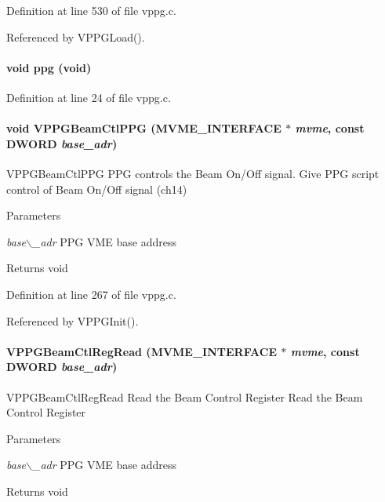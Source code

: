 Definition at line 530 of file vppg.c.

Referenced by VPPGLoad().
\paragraph[{ppg}]{\setlength{\rightskip}{0pt plus 5cm}void ppg (void)}\hfill\label{vppg_8c_a763ec2fd56afac7a05f9d3ca2d29328e}


Definition at line 24 of file vppg.c.
\paragraph[{VPPGBeamCtlPPG}]{\setlength{\rightskip}{0pt plus 5cm}void VPPGBeamCtlPPG ({\bf MVME\_\-INTERFACE} $\ast$ {\em mvme}, \/  const {\bf DWORD} {\em base\_\-adr})}\hfill\label{vppg_8c_a243cf578335a36f73dafcacfc457aaaa}
VPPGBeamCtlPPG PPG controls the Beam On/Off signal.  Give PPG script control of Beam On/Off signal (ch14) 
\begin{DoxyParams}{Parameters}
\item[{\em base$\backslash$\_\-adr}]PPG VME base address \end{DoxyParams}
\begin{DoxyReturn}{Returns}
void 
\end{DoxyReturn}


Definition at line 267 of file vppg.c.

Referenced by VPPGInit().
\paragraph[{VPPGBeamCtlRegRead}]{ VPPGBeamCtlRegRead ({\bf MVME\_\-INTERFACE} $\ast$ {\em mvme}, \/  const {\bf DWORD} {\em base\_\-adr})}\hfill\label{vppg_8c_a57fead0a3fec6c6b119298e43a26a3e5}
VPPGBeamCtlRegRead Read the Beam Control Register  Read the Beam Control Register 
\begin{DoxyParams}{Parameters}
\item[{\em base$\backslash$\_\-adr}]PPG VME base address \end{DoxyParams}
\begin{DoxyReturn}{Returns}
void 
\end{DoxyReturn}


